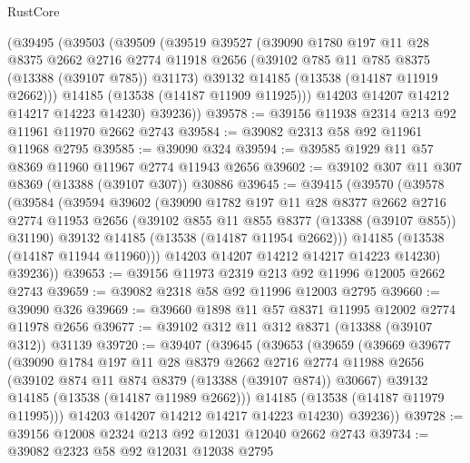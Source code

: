 \begin{lexlean}{RustCore}
\begin{coremodule}
    (@39495
      (@39503
        (@39509
          (@39519
            @39527
            (@39090
              @1780
              @197
              @11
              @28
              @8375
              @2662
              @2716
              @2774
              @11918
              @2656
              (@39102 @785 @11 @785 @8375 (@13388 (@39107 @785)) @31173)
              @39132
              @14185
              (@13538 (@14187 @11919 @2662)))
            @14185
            (@13538 (@14187 @11909 @11925)))
          @14203
          @14207
          @14212
          @14217
          @14223
          @14230)
        @39236))
@39578 := @39156 @11938 @2314 @213 @92 @11961 @11970 @2662 @2743
@39584 := @39082 @2313 @58 @92 @11961 @11968 @2795
@39585 := @39090 @324
@39594 := @39585 @1929 @11 @57 @8369 @11960 @11967 @2774 @11943 @2656
@39602 := @39102 @307 @11 @307 @8369 (@13388 (@39107 @307)) @30886
@39645 := @39415
    (@39570
      (@39578
        (@39584
          (@39594
            @39602
            (@39090
              @1782
              @197
              @11
              @28
              @8377
              @2662
              @2716
              @2774
              @11953
              @2656
              (@39102 @855 @11 @855 @8377 (@13388 (@39107 @855)) @31190)
              @39132
              @14185
              (@13538 (@14187 @11954 @2662)))
            @14185
            (@13538 (@14187 @11944 @11960)))
          @14203
          @14207
          @14212
          @14217
          @14223
          @14230)
        @39236))
@39653 := @39156 @11973 @2319 @213 @92 @11996 @12005 @2662 @2743
@39659 := @39082 @2318 @58 @92 @11996 @12003 @2795
@39660 := @39090 @326
@39669 := @39660 @1898 @11 @57 @8371 @11995 @12002 @2774 @11978 @2656
@39677 := @39102 @312 @11 @312 @8371 (@13388 (@39107 @312)) @31139
@39720 := @39407
    (@39645
      (@39653
        (@39659
          (@39669
            @39677
            (@39090
              @1784
              @197
              @11
              @28
              @8379
              @2662
              @2716
              @2774
              @11988
              @2656
              (@39102 @874 @11 @874 @8379 (@13388 (@39107 @874)) @30667)
              @39132
              @14185
              (@13538 (@14187 @11989 @2662)))
            @14185
            (@13538 (@14187 @11979 @11995)))
          @14203
          @14207
          @14212
          @14217
          @14223
          @14230)
        @39236))
@39728 := @39156 @12008 @2324 @213 @92 @12031 @12040 @2662 @2743
@39734 := @39082 @2323 @58 @92 @12031 @12038 @2795

\end{coremodule}
\end{lexlean}
